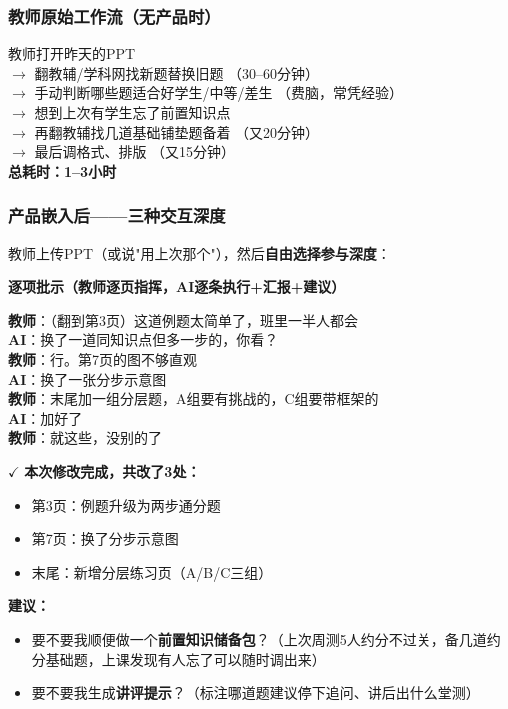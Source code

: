 \documentclass[11pt,a4paper]{article}
\newcommand{\done}{\ding{192}}
\begin{document}
\subsubsection*{教师原始工作流（无产品时）}

\begin{oldflow}
教师打开昨天的PPT\\
$\rightarrow$ 翻教辅/学科网找新题替换旧题 \hfill（30--60分钟）\\
$\rightarrow$ 手动判断哪些题适合好学生/中等/差生 \hfill（费脑，常凭经验）\\
$\rightarrow$ 想到上次有学生忘了前置知识点\\
$\rightarrow$ 再翻教辅找几道基础铺垫题备着 \hfill（又20分钟）\\
$\rightarrow$ 最后调格式、排版 \hfill（又15分钟）\\[4pt]
\textbf{总耗时：1--3小时}
\end{oldflow}

\subsubsection*{产品嵌入后——三种交互深度}

教师上传PPT（或说"用上次那个"），然后\textbf{自由选择参与深度}：

\bigskip
\noindent\textbf{\done{} 逐项批示（教师逐页指挥，AI逐条执行+汇报+建议）}

\begin{dialogue}
\textbf{教师}：（翻到第3页）这道例题太简单了，班里一半人都会\\
\textbf{AI}：换了一道同知识点但多一步的，你看？\\
\textbf{教师}：行。第7页的图不够直观\\
\textbf{AI}：换了一张分步示意图\\
\textbf{教师}：末尾加一组分层题，A组要有挑战的，C组要带框架的\\
\textbf{AI}：加好了\\
\textbf{教师}：就这些，没别的了
\end{dialogue}

\begin{aiplan}[AI 汇报执行情况]
$\checkmark$ \textbf{本次修改完成，共改了3处：}
\begin{itemize}[leftmargin=1.5em,nosep]
  \item 第3页：例题升级为两步通分题
  \item 第7页：换了分步示意图
  \item 末尾：新增分层练习页（A/B/C三组）
\end{itemize}
\medskip
\textbf{建议：}
\begin{itemize}[leftmargin=1.5em,nosep]
  \item 要不要我顺便做一个\textbf{前置知识储备包}？（上次周测5人约分不过关，备几道约分基础题，上课发现有人忘了可以随时调出来）
  \item 要不要我生成\textbf{讲评提示}？（标注哪道题建议停下追问、讲后出什么堂测）
\end{itemize}
\end{aiplan}
\end{document}
